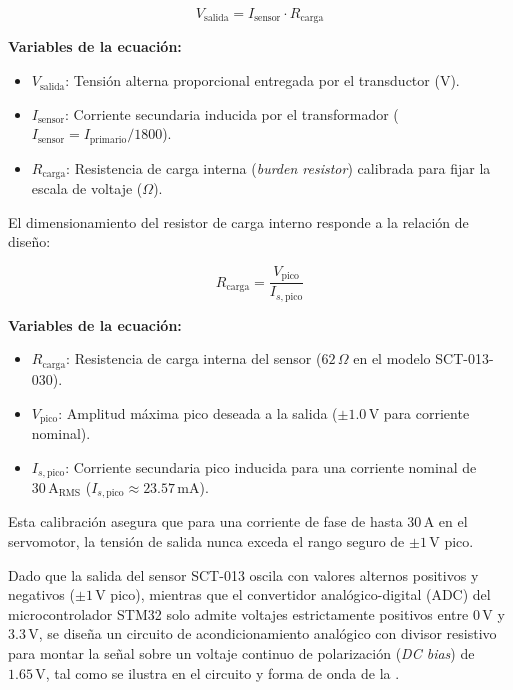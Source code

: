 \begin{equation}
V_{\text{salida}} = I_{\text{sensor}} \cdot R_{\text{carga}}
\label{eq:sensor_corriente}
\end{equation}

\noindent\textbf{Variables de la ecuación:}
\begin{itemize}
    \item $V_{\text{salida}}$: Tensión alterna proporcional entregada por el transductor ($\text{V}$).
    \item $I_{\text{sensor}}$: Corriente secundaria inducida por el transformador ($I_{\text{sensor}} = I_{\text{primario}} / 1800$).
    \item $R_{\text{carga}}$: Resistencia de carga interna (\textit{burden resistor}) calibrada para fijar la escala de voltaje ($\Omega$).
\end{itemize}

El dimensionamiento del resistor de carga interno responde a la relación de diseño:

\begin{equation}
R_{\text{carga}} = \frac{V_{\text{pico}}}{I_{s,\text{pico}}}
\label{eq:resistor_burden}
\end{equation}

\noindent\textbf{Variables de la ecuación:}
\begin{itemize}
    \item $R_{\text{carga}}$: Resistencia de carga interna del sensor ($62\,\Omega$ en el modelo SCT-013-030).
    \item $V_{\text{pico}}$: Amplitud máxima pico deseada a la salida ($\pm 1.0\,\text{V}$ para corriente nominal).
    \item $I_{s,\text{pico}}$: Corriente secundaria pico inducida para una corriente nominal de $30\,\text{A}_{\text{RMS}}$ ($I_{s,\text{pico}} \approx 23.57\,\text{mA}$).
\end{itemize}

Esta calibración asegura que para una corriente de fase de hasta $30\,\text{A}$ en el servomotor, la tensión de salida nunca exceda el rango seguro de $\pm 1\,\text{V}$ pico.

Dado que la salida del sensor SCT-013 oscila con valores alternos positivos y negativos ($\pm 1\,\text{V}$ pico), mientras que el convertidor analógico-digital (ADC) del microcontrolador STM32 solo admite voltajes estrictamente positivos entre $0\,\text{V}$ y $3.3\,\text{V}$, se diseña un circuito de acondicionamiento analógico con divisor resistivo para montar la señal sobre un voltaje continuo de polarización (\textit{DC bias}) de $1.65\,\text{V}$, tal como se ilustra en el circuito y forma de onda de la .

